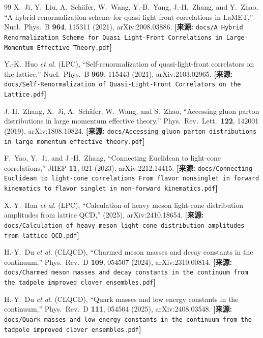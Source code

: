 \documentclass[12pt,a4paper]{ctexart}
\theoremstyle{definition}
\begin{document}
\begin{thebibliography}{99}
X.~Ji, Y.~Liu, A.~Sch\"afer, W.~Wang, Y.-B.~Yang, J.-H.~Zhang, and Y.~Zhao,
``A hybrid renormalization scheme for quasi light-front correlations in LaMET,''
Nucl.\ Phys.\ B \textbf{964}, 115311 (2021), arXiv:2008.03886.
\quad\textbf{[来源:} \texttt{docs/A Hybrid Renormalization Scheme for Quasi Light-Front Correlations in Large-Momentum Effective Theory.pdf}\textbf{]}

Y.-K.~Huo \textit{et al.} (LPC),
``Self-renormalization of quasi-light-front correlators on the lattice,''
Nucl.\ Phys.\ B \textbf{969}, 115443 (2021), arXiv:2103.02965.
\quad\textbf{[来源:} \texttt{docs/Self-Renormalization of Quasi-Light-Front Correlators on the Lattice.pdf}\textbf{]}

J.-H.~Zhang, X.~Ji, A.~Sch\"afer, W.~Wang, and S.~Zhao,
``Accessing gluon parton distributions in large momentum effective theory,''
Phys.\ Rev.\ Lett.\ \textbf{122}, 142001 (2019), arXiv:1808.10824.
\quad\textbf{[来源:} \texttt{docs/Accessing gluon parton distributions in large momentum effective theory.pdf}\textbf{]}

F.~Yao, Y.~Ji, and J.-H.~Zhang,
``Connecting Euclidean to light-cone correlations,''
JHEP \textbf{11}, 021 (2023), arXiv:2212.14415.
\quad\textbf{[来源:} \texttt{docs/Connecting Euclidean to light-cone correlations From flavor nonsinglet in forward kinematics to flavor singlet in non-forward kinematics.pdf}\textbf{]}

X.-Y.~Han \textit{et al.} (LPC),
``Calculation of heavy meson light-cone distribution amplitudes from lattice QCD,''
(2025), arXiv:2410.18654.
\quad\textbf{[来源:} \texttt{docs/Calculation of heavy meson light-cone distribution amplitudes from lattice QCD.pdf}\textbf{]}

H.-Y.~Du \textit{et al.} (CLQCD),
``Charmed meson masses and decay constants in the continuum,''
Phys.\ Rev.\ D \textbf{109}, 054507 (2024), arXiv:2310.00814.
\quad\textbf{[来源:} \texttt{docs/Charmed meson masses and decay constants in the continuum from the tadpole improved clover ensembles.pdf}\textbf{]}

H.-Y.~Du \textit{et al.} (CLQCD),
``Quark masses and low energy constants in the continuum,''
Phys.\ Rev.\ D \textbf{111}, 054504 (2025), arXiv:2408.03548.
\quad\textbf{[来源:} \texttt{docs/Quark masses and low energy constants in the continuum from the tadpole improved clover ensembles.pdf}\textbf{]}


\end{thebibliography}
\end{document}
